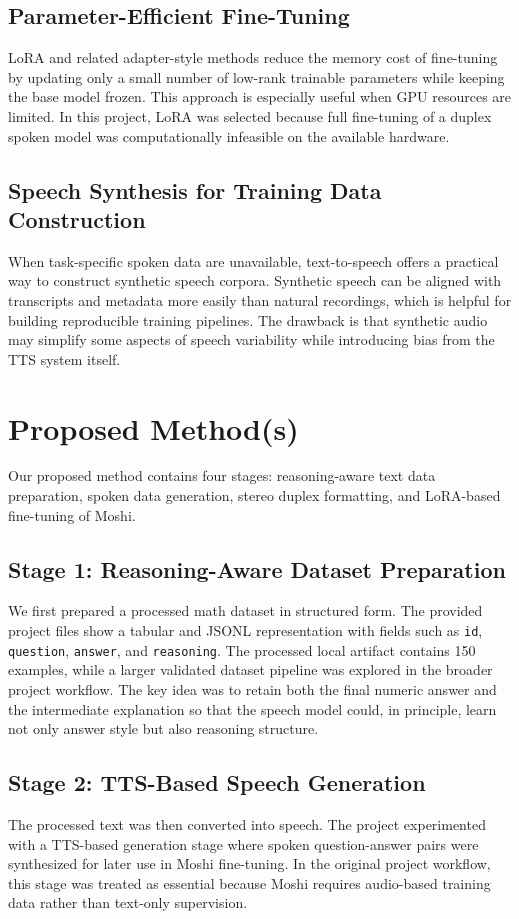 \documentclass[12pt,a4paper]{article}
\begin{document}
\subsection{Parameter-Efficient Fine-Tuning}
LoRA and related adapter-style methods reduce the memory cost of fine-tuning by updating only a small number of low-rank trainable parameters while keeping the base model frozen. This approach is especially useful when GPU resources are limited. In this project, LoRA was selected because full fine-tuning of a duplex spoken model was computationally infeasible on the available hardware.

\subsection{Speech Synthesis for Training Data Construction}
When task-specific spoken data are unavailable, text-to-speech offers a practical way to construct synthetic speech corpora. Synthetic speech can be aligned with transcripts and metadata more easily than natural recordings, which is helpful for building reproducible training pipelines. The drawback is that synthetic audio may simplify some aspects of speech variability while introducing bias from the TTS system itself.

\section{Proposed Method(s)}
Our proposed method contains four stages: reasoning-aware text data preparation, spoken data generation, stereo duplex formatting, and LoRA-based fine-tuning of Moshi.

\subsection{Stage 1: Reasoning-Aware Dataset Preparation}
We first prepared a processed math dataset in structured form. The provided project files show a tabular and JSONL representation with fields such as \texttt{id}, \texttt{question}, \texttt{answer}, and \texttt{reasoning}. The processed local artifact contains 150 examples, while a larger validated dataset pipeline was explored in the broader project workflow. The key idea was to retain both the final numeric answer and the intermediate explanation so that the speech model could, in principle, learn not only answer style but also reasoning structure.

\subsection{Stage 2: TTS-Based Speech Generation}
The processed text was then converted into speech. The project experimented with a TTS-based generation stage where spoken question-answer pairs were synthesized for later use in Moshi fine-tuning. In the original project workflow, this stage was treated as essential because Moshi requires audio-based training data rather than text-only supervision.
\end{document}

